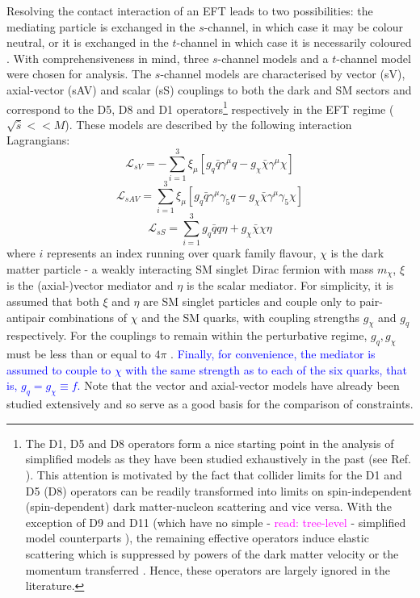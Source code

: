\begin{flushleft}
Resolving the contact interaction of an EFT leads to two possibilities: the mediating particle is exchanged in the $s$-channel, in which case it may be colour neutral, or it is exchanged in the $t$-channel in which case it is necessarily coloured \cite{}. With comprehensiveness in mind, three $s$-channel models and a $t$-channel model were chosen for analysis. The $s$-channel models are characterised by vector (sV), axial-vector (sAV) and scalar (sS) couplings to both the dark and SM sectors and correspond to the D5, D8 and D1 operators\footnote{The D1, D5 and D8 operators form a nice starting point in the analysis of simplified models as they have been studied exhaustively in the past (see Ref. \cite{}). This attention is motivated by the fact that collider limits for the D1 and D5 (D8) operators can be readily transformed into limits on spin-independent (spin-dependent) dark matter-nucleon scattering and vice versa. With the exception of D9 and D11 (which have no simple - \textcolor{magenta}{read: tree-level} - simplified model counterparts \cite{}), the remaining effective operators induce elastic scattering which is suppressed by powers of the dark matter velocity or the momentum transferred \cite{Kumar}. Hence, these operators are largely ignored in the literature.} respectively in the EFT regime ($\sqrt{\hat{s}} << M$). These models are described by the following interaction Lagrangians:
\begin{equation}
\label{L_int_sV}
\mathcal{L}_{sV} = -\sum\limits_{i=1}^{3} \xi_{\mu}\left[g_{q}\bar{q}\gamma^{\mu}q - g_{\chi}\bar{\chi}\gamma^{\mu}\chi\right]
\end{equation}
\begin{equation}
\label{L_int_sAV}
\mathcal{L}_{sAV} = \sum\limits_{i=1}^{3} \xi_{\mu}\left[g_{q}\bar{q}\gamma^{\mu}\gamma_{5}q - g_{\chi}\bar{\chi}\gamma^{\mu}\gamma_{5}\chi\right]
\end{equation}
\begin{equation}
\label{L_int_sS}
\mathcal{L}_{sS} = \sum\limits_{i=1}^{3} g_{q}\bar{q}q\eta + g_{\chi}\bar{\chi}\chi\eta
\end{equation}
where $i$ represents an index running over quark family flavour, $\chi$ is the dark matter particle - a weakly interacting SM singlet Dirac fermion with mass $m_{\chi}$, $\xi$ is the (axial-)vector mediator and $\eta$ is the scalar mediator. For simplicity, it is assumed that both $\xi$ and $\eta$ are SM singlet particles and couple only to pair-antipair combinations of $\chi$ and the SM quarks, with coupling strengths $g_{\chi}$ and $g_q$ respectively. For the couplings to remain within the perturbative regime, $g_{q},g_{\chi}$ must be less than or equal to $4\pi$ \cite{ValidEFT}. \textcolor{blue}{Finally, for convenience, the mediator is assumed to couple to $\chi$ with the same strength as to each of the six quarks, that is, $g_{q} = g_{\chi} \equiv f$.} Note that the vector and axial-vector models have already been studied extensively \cite{Buchmueller:2014yoa, Chatrchyan:2013qha, Aad:2012hf, Harris:2014hga} and so serve as a good basis for the comparison of constraints.


\end{flushleft}
